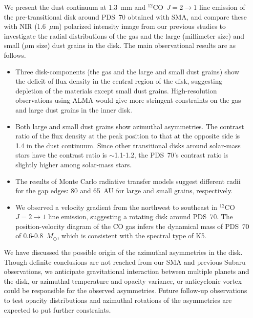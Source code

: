 \documentclass[apj]{emulateapj-rtx4}
\begin{document}
  We present the dust continuum at 1.3~mm and $^{12}$CO~$J=2\rightarrow1$ line emission of the pre-transitional disk
  around PDS~70 obtained with SMA, and compare these with NIR (1.6~$\mu$m) polarized intensity image from our previous studies
  to investigate the radial distributions of the gas and the large (millimeter size) and small ($\mu$m size) dust grains
  in the disk. The main observational results are as follows.
  \begin{itemize}
  \item Three disk-components (the gas and the large and small dust grains) show the deficit of flux density 
    in the central region 
    of the disk, suggesting depletion of the materials except small dust grains.
    High-resolution observations using 
ALMA would give more stringent constraints on the gas and large dust grains in the inner disk.
  \item 
Both large and small dust grains show azimuthal asymmetries. 
    The contrast ratio of the flux
    density at the peak position to that at the opposite side is 1.4 in the dust continuum. Since other transitional disks around
    solar-mass stars have the contrast ratio is $\sim$1.1-1.2, the PDS~70's contrast ratio is slightly higher among solar-mass stars.
  \item 
    The results of Monte Carlo radiative transfer models suggest different radii
    for the gap edges: 80 and 65~AU for large and small grains, respectively.
  \item We observed a velocity gradient from the northwest to southeast in $^{12}$CO~$J=2\rightarrow1$ line emission, suggesting 
    a rotating disk around PDS~70. The position-velocity  diagram of the CO gas infers the dynamical mass of PDS~70 of 
    0.6-0.8~$M_{\odot}$, which is consistent with the spectral type of K5.
  \end{itemize}

  We have discussed the possible origin of the azimuthal asymmetries in the disk. Though definite conclusions are not reached from
  our SMA and previous Subaru observations, we anticipate gravitational interaction between multiple planets and the disk, or
  azimuthal temperature and opacity variance, or anticyclonic vortex
  could be responsible for the observed asymmetries. 
  Future follow-up observations to test opacity distributions and 
  azimuthal rotations of the asymmetries are expected to put further constraints.
\end{document}

